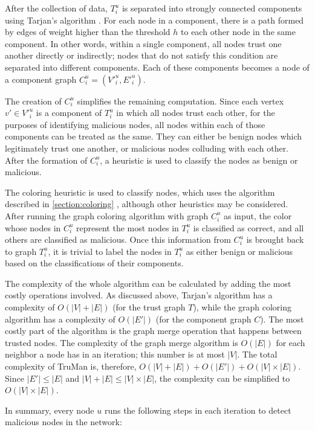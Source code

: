 After the collection of data, $T^u_i$ is separated into strongly connected components using Tarjan's algorithm \cite{tarjan1972depth}.
For each node in a component, there is a path formed by edges of weight higher than the threshold $h$ to each other node in the same component.
In other words, within a single component, all nodes trust one another directly or indirectly; nodes that do not satisfy this condition are separated into different components.
Each of these components becomes a node of a component graph $C^u_i = (V'^u_i, E'^u_i)$.

The creation of $C^u_i$ simplifies the remaining computation.
Since each vertex $v' \in V'^u_i$ is a component of $T^u_i$ in which all nodes trust each other, for the purposes of identifying malicious nodes, all nodes within each of those components can be treated as the same.
They can either be benign nodes which legitimately trust one another, or malicious nodes colluding with each other.
After the formation of $C^u_i$, a heuristic is used to classify the nodes as benign or malicious.

The coloring heuristic is used to classify nodes, which uses the algorithm described in \autoref{section:coloring} \cite{mittal2011graph}, although other heuristics may be considered.
After running the graph coloring algorithm with graph $C^u_i$ as input, the color whose nodes in $C^u_i$ represent the most nodes in $T^u_i$ is classified as correct, and all others are classified as malicious.
Once this information from $C^u_i$ is brought back to graph $T^u_i$, it is trivial to label the nodes in $T^u_i$ as either benign or malicious based on the classifications of their components.

The complexity of the whole algorithm can be calculated by adding the most costly operations involved.
As discussed above, Tarjan's algorithm has a complexity of $O(|V|+|E|)$ (for the trust graph $T$), while the graph coloring algorithm has a complexity of $O(|E'|)$ (for the component graph $C$).
The most costly part of the algorithm is the graph merge operation that happens between trusted nodes.
The complexity of the graph merge algorithm is $O(|E|)$ for each neighbor a node has in an iteration; this number is at most $|V|$.
The total complexity of TruMan is, therefore, $O(|V|+|E|)+O(|E'|)+O(|V|\times |E|)$.
Since $|E'| \leq |E|$ and $|V|+|E| \leq |V|\times |E|$, the complexity can be simplified to $O(|V| \times |E|)$.

In summary, every node $u$ runs the following steps in each iteration to detect malicious nodes in the network:

